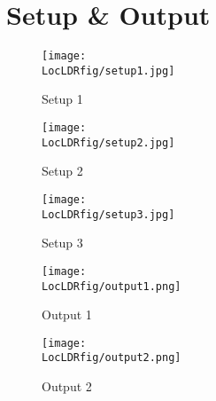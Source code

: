 \section{Setup \& Output}
\begin{figure}[hpt]
  \centering
    \texttt{[image: \\LocLDRfig/setup1.jpg]}
    \label{fig:set1} \hfill
  \caption{Setup 1}
\end{figure}
\begin{figure}[hpt]
  \centering
    \texttt{[image: \\LocLDRfig/setup2.jpg]}
    \label{fig:set2} \hfill
  \caption{Setup 2}
\end{figure}
\begin{figure}[hpt]
  \centering
    \texttt{[image: \\LocLDRfig/setup3.jpg]}
    \label{fig:set3} \hfill
  \caption{Setup 3}
\end{figure}
\begin{figure}[hpt]
  \centering
    \texttt{[image: \\LocLDRfig/output1.png]}
    \label{fig:out1} \hfill
  \caption{Output 1}
\end{figure}
\begin{figure}[hpt]
  \centering
    \texttt{[image: \\LocLDRfig/output2.png]}
    \label{fig:out2} \hfill
  \caption{Output 2}
\end{figure}














